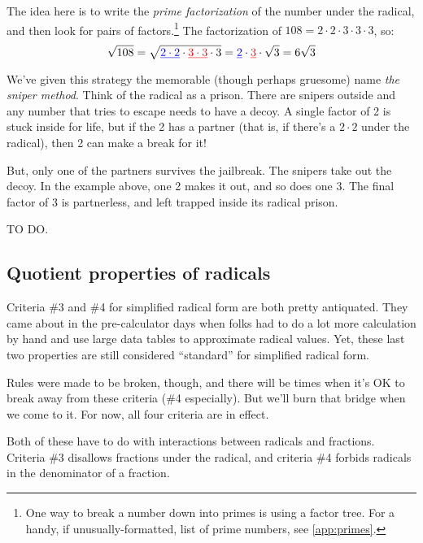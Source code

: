 The idea here is to write the \textit{prime factorization} of the number under the radical, and then look for pairs of factors.\footnote{One way to break a number down into primes is using a factor tree. For a handy, if unusually-formatted, list of prime numbers, see \cref{app:primes}.} The factorization of $108 = 2 \cdot 2 \cdot 3 \cdot 3 \cdot 3$, so: \[\sqrt{108} = \sqrt{\underline{\color{blue}2 \cdot 2} \cdot \underline{\color{red}3 \cdot 3} \cdot 3} = \underline{\color{blue}2} \cdot \underline{\color{red}3} \cdot \sqrt{3} = 6\sqrt{3} \]

We've given this strategy the memorable (though perhaps gruesome) name \textit{the sniper method}. Think of the radical as a prison. There are snipers outside and any number that tries to escape needs to have a decoy. A single factor of 2 is stuck inside for life, but if the 2 has a partner (that is, if there's a $2 \cdot 2$ under the radical), then 2 can make a break for it!

But, only one of the partners survives the jailbreak. The snipers take out the decoy. In the example above, one 2 makes it out, and so does one 3. The final factor of 3 is partnerless, and left trapped inside its radical prison.

\begin{boxex}
	TO DO.
\end{boxex}

\subsection{Quotient properties of radicals}
\label{sec:radquotient}

Criteria \#3 and \#4 for simplified radical form are both pretty antiquated. They came about in the pre-calculator days when folks had to do a lot more calculation by hand and use large data tables to approximate radical values. Yet, these last two properties are still considered ``standard'' for simplified radical form.


Rules were made to be broken, though, and there will be times when it's OK to break away from these criteria (\#4 especially). But we'll burn that bridge when we come to it. For now, all four criteria are in effect.

Both of these have to do with interactions between radicals and fractions. Criteria \#3 disallows fractions under the radical, and criteria \#4 forbids radicals in the denominator of a fraction.

